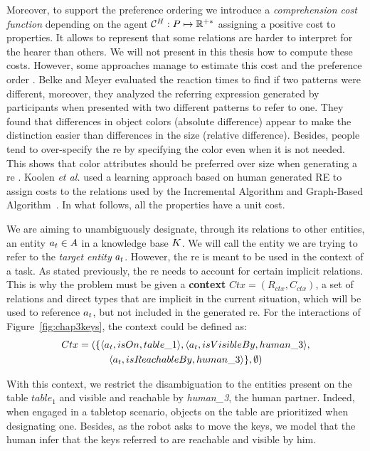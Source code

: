 \documentclass[a4paper,11pt,twoside]{StyleThese}
\begin{document}
Moreover, to support the preference ordering we introduce a \textit{comprehension cost function} depending on the agent $\mathcal{C}^H: P \mapsto \mathbb{R}^{+*}$ assigning a positive cost to properties. It allows to represent that some relations are harder to interpret for the hearer than others. We will not present in this thesis how to compute these costs. However, some approaches manage to estimate this cost and the preference order \cite{belke2002tracking, koolen2012learning}. Belke and Meyer evaluated the reaction times to find if two patterns were different, moreover, they analyzed the referring expression generated by participants when presented with two different patterns to refer to one. They found that differences in object colors (absolute difference) appear to make the distinction easier than differences in the size (relative difference). Besides, people tend to over-specify the \acrfull{re} by specifying the color even when it is not needed. This shows that color attributes should be preferred over size when generating a \acrshort{re} \cite{belke2002tracking}. Koolen \textit{et al.} used a learning approach based on human generated RE to assign costs to the relations used by the Incremental Algorithm and Graph-Based Algorithm~\cite{koolen2012learning}. In what follows, all the properties have a unit cost.

We are aiming to unambiguously designate, through its relations to other entities, an entity $a_t \in A$ in a knowledge base $K$. We will call the entity we are trying to refer to the \textit{target entity} $a_t$.
However, the \acrshort{re} is meant to be used in the context of a task. As stated previously, the \acrshort{re} needs to account for certain implicit relations. This is why the problem must be given a \textbf{context} $Ctx = (R_{ctx}, C_{ctx})$, a set of relations and direct types that are implicit in the current situation, which will be used to reference $a_t$, but not included in the generated \acrshort{re}. For the interactions of Figure~\ref{fig:chap3keys}, the context could be defined as:
\begin{multline*}
Ctx = (\{ \langle a_t, isOn, table\_1 \rangle, \langle a_t, isVisibleBy, human\_3 \rangle,\\
\langle a_t, isReachableBy, human\_3 \rangle \}, \emptyset)
\end{multline*}

With this context, we restrict the disambiguation to the entities present on the table $table_1$ and visible and reachable by \textit{human\_3}, the human partner. Indeed, when engaged in a tabletop scenario, objects on the table are prioritized when designating one. Besides, as the robot asks to move the keys, we model that the human infer that the keys referred to are reachable and visible by him.
\end{document}
